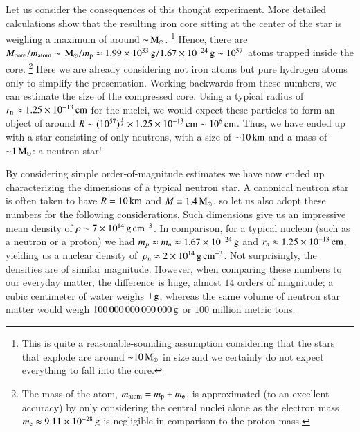 Let us consider the consequences of this thought experiment.
More detailed calculations show that the resulting iron core sitting at the center of the star is weighing a maximum of around $\mathord{\sim} \, \mathrm{M}_{\odot}$.%
\footnote{This is quite a reasonable-sounding assumption considering that the stars that explode are around $\mathord{\sim}10\, \mathrm{M}_{\odot}$ in size and we certainly do not expect everything to fall into the core.
}
Hence, there are $M_{\mathrm{core}} / m_{\mathrm{atom}} \sim \, \mathrm{M}_{\odot} / m_{\mathrm{p}} \approx 1.99 \times 10^{33} \, \mathrm{g} / 1.67 \times 10^{-24} \, \mathrm{g} \sim 10^{57}$ atoms trapped inside the core.
\footnote{
    The mass of the atom, $m_{\mathrm{atom}} = m_{\mathrm{p}} + m_{\mathrm{e}}$, is approximated (to an excellent accuracy) by only considering the central nuclei alone as the electron mass $m_{\mathrm{e}} \approx 9.11 \times 10^{-28} \, \mathrm{g}$ is negligible in comparison to the proton mass.
}
Here we are already considering not iron atoms but pure hydrogen atoms only to simplify the presentation.
Working backwards from these numbers, we can estimate the size of the compressed core.
Using a typical radius of $r_{\mathrm{n}} \approx 1.25 \times 10^{-13}\, \mathrm{cm}$ for the nuclei, we would expect these particles to form an object of around $R \sim (10^{57})^{\frac{1}{3}} \times 1.25 \times 10^{-13}\, \mathrm{cm} \sim 10^6 \, \mathrm{cm}$. Thus, we have ended up with a star consisting of only neutrons, with a size of $\mathord{\sim} 10\, \mathrm{km}$ and a mass of $\mathord{\sim} 1\, \mathrm{M}_{\odot}$: a neutron star!

By considering simple order-of-magnitude estimates we have now ended up characterizing the dimensions of a typical neutron star. %
A canonical neutron star is often taken to have $R=10\, \mathrm{km}$ and $M=1.4\, \mathrm{M}_{\odot}$, so let us also adopt these numbers for the following considerations.
Such dimensions give us an impressive mean density of $\rho \sim 7 \times 10^{14} \, \mathrm{g}\,\mathrm{cm}^{-3}$.
In comparison, for a typical nucleon (such as a neutron or a proton) we had $m_{p} \approx m_{n} \approx 1.67 \times 10^{-24} \, \mathrm{g}$ and $r_{n} \approx 1.25 \times 10^{-13} \, \mathrm{cm}$, yielding us a nuclear density of $\, \rho_{\mathrm{n}}  \approx 2 \times 10^{14} \, \mathrm{g}\,\mathrm{cm}^{-3}$.
Not surprisingly, the densities are of similar magnitude.
However, when comparing these numbers to our everyday matter, the difference is huge, almost $14$ orders of magnitude;
a cubic centimeter of water weighs $1\, \mathrm{g}$, whereas the same volume of neutron star matter would weigh $100\,000\,000\,000\,000\, \mathrm{g}$ or $100$ million metric tons.


